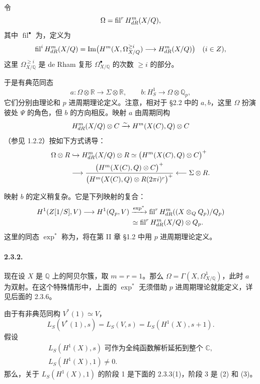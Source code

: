 令
\[
 \Omega=\operatorname{fil}^rH^m_{dR}(X/Q),
\]
其中 $\operatorname{fil}^\bullet$ 为，定义为
\[
 \operatorname{fil}^iH^m_{dR}(X/Q)
 =\operatorname{Im}\bigl(H^m(X,\Omega^{\ge i}_{X/Q})\longrightarrow H^m_{dR}(X/Q)\bigr)
 \quad(i\in Z),
\]
这里 $\Omega^{\ge i}_{X/\mathbb Q}$ 是 de Rham 复形 $\Omega^\bullet_{X/\mathbb Q}$ 的次数 $\ge i$ 的部分。

于是有典范同态
\[
 a:\Omega\otimes\mathbb R\longrightarrow\Sigma\otimes\mathbb R,
 \qquad b:H^1_S\longrightarrow\Omega\otimes\mathbb Q_p,
\]
它们分别由理论和 $p$ 进周期理论定义。注意，相对于 §2.2 中的 $a,b$，这里 $\Omega$ 扮演彼处 $\Psi$ 的角色，但 $b$ 的方向相反。映射 $a$ 由周期同构
\[
 H^m_{dR}(X/Q)\otimes C
 \xrightarrow{\sim}H^m(X(C),Q)\otimes C
\]
（参见 1.2.2）按如下方式诱导：
\begin{align*}
 \Omega\otimes R&\hookrightarrow H^m_{dR}(X/Q)\otimes R
 \simeq\bigl(H^m(X(C),Q)\otimes C\bigr)^+\\
 &\longrightarrow
 \frac{\bigl(H^m(X(C),Q)\otimes C\bigr)^+}
 {\bigl(H^m(X(C),Q)\otimes R(2\pi i)^r\bigr)^+}
 \longleftarrow\Sigma\otimes R.
\end{align*}

映射 $b$ 的定义稍复杂。它是下列映射的复合：
\begin{align*}
 H^1(Z[1/S],V)&\longrightarrow H^1(Q_p,V)
 \xrightarrow{\exp^*}\operatorname{fil}^rH^m_{dR}((X\otimes_{Q}Q_p)/Q_p)\\
 &\hspace{7em}\simeq\operatorname{fil}^rH^m_{dR}(X/Q)\otimes Q_p.
\end{align*}
这里的同态 $\exp^*$ 称为，将在第 II 章 §1.2 中用 $p$ 进周期理论定义。

\paragraph{2.3.2.} 现在设 $X$ 是 $\mathbb Q$ 上的阿贝尔簇，取 $m=r=1$。那么 $\Omega=\Gamma(X,\Omega^1_{X/\mathbb Q})$，此时 $a$ 为双射。在这个特殊情形中，上面的 $\exp^*$ 无须借助 $p$ 进周期理论就能定义，详见后面的 2.3.6。

由于有非典范同构 $V^*(1)\simeq V$，
\[
 L_S(V^*(1),s)=L_S(V,s)=L_S(H^1(X),s+1).
\]
假设
\begin{equation*}
 \tag{*}
 \begin{gathered}
 L_S(H^1(X),s)\text{ 可作为全纯函数解析延拓到整个 }\mathbb C,\\
 L_S(H^1(X),1)\ne0.
 \end{gathered}
\end{equation*}
那么，关于 $L_S(H^1(X),1)$ 的阶段 1 是下面的 2.3.3(1)，阶段 3 是 (2) 和 (3)。

